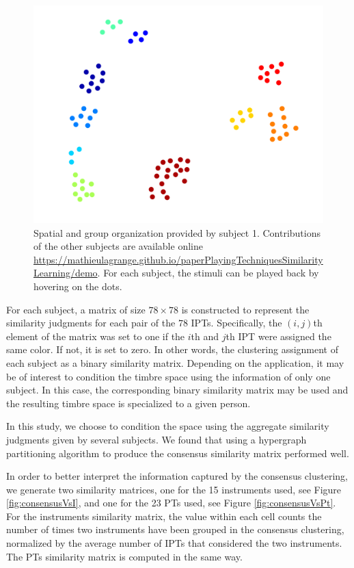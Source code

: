 \documentclass{bmcart}
\begin{document}
\begin{figure}
\center
\includegraphics[width = \textwidth]{figures/xp2example1.png}
\caption{Spatial and group organization provided by subject 1. Contributions of the other subjects are available online \url{https://mathieulagrange.github.io/paperPlayingTechniquesSimilarityLearning/demo}. For each subject, the stimuli can be played back by hovering on the dots.}
\label{fig:xp2display}
\end{figure}

For each subject, a matrix of size $78 \times 78$ is constructed to represent the similarity judgments for each pair of the $78$ IPTs.
Specifically, the $(i, j)$th element of the matrix was set to one if the $i$th and $j$th IPT were assigned the same color.
If not, it is set to zero.
In other words, the clustering assignment of each subject as a binary similarity matrix. Depending on the application, it may be of interest to condition the timbre space using the information of only one subject. In this case, the corresponding binary similarity matrix may be used and the resulting timbre space is specialized to a given person.


In this study, we choose to condition the space using the aggregate similarity judgments given by several subjects. We found that using a hypergraph partitioning algorithm \cite{kernighan1970efficient,han1997scalable,strehl2002cluster} to produce the consensus similarity matrix performed well.

In order to better interpret the information captured by the consensus clustering, we generate two similarity matrices, one for the 15 instruments used, see Figure \ref{fig:consensusVsI}, and one for the 23 PTs used, see Figure \ref{fig:consensusVsPt}. For the instruments similarity matrix, the value within each cell counts the number of times two instruments have been grouped in the consensus clustering, normalized by the average number of IPTs that considered the two instruments. The PTs similarity matrix is computed in the same way.
\end{document}

